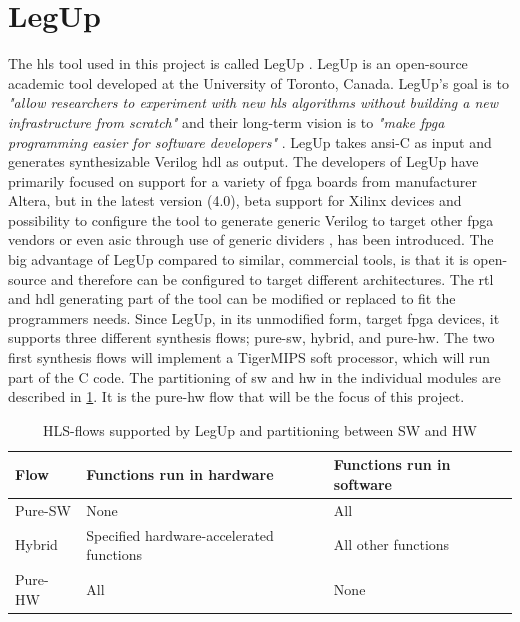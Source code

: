 \section{LegUp}
The \gls{hls} tool used in this project is called LegUp \cite{canis2011legup}. LegUp is an open-source academic tool developed at the University of Toronto, Canada. LegUp's goal is to \textit{"allow researchers to experiment with new \gls{hls} algorithms without building a new infrastructure from scratch"} and their long-term vision is to \textit{"make \gls{fpga} programming easier for software developers"} \cite{legupmain}. LegUp takes \gls{ansi}-C as input and generates synthesizable Verilog \gls{hdl} as output. The developers of LegUp have primarily focused on support for a variety of \gls{fpga} boards from manufacturer Altera, but in the latest version (4.0), beta support for Xilinx devices \cite{legupxilinx} and possibility to configure the tool to generate generic Verilog to target other \gls{fpga} vendors or even \gls{asic} through use of generic dividers \cite{legupfaq}, has been introduced. The big advantage of LegUp compared to similar, commercial tools, is that it is open-source and therefore can be configured to target different architectures. The \gls{rtl} and \gls{hdl} generating part of the tool can be modified or replaced to fit the programmers needs.
Since LegUp, in its unmodified form, target \gls{fpga} devices, it supports three different synthesis flows; pure-\gls{sw}, hybrid, and pure-\gls{hw}. The two first synthesis flows will implement a TigerMIPS \cite{tigmips} soft processor, which will run part of the C code. The partitioning of \gls{sw} and \gls{hw} in the individual modules are described in \cref{tab:legupflows}. It is the pure-\gls{hw} flow that will be the focus of this project.

\begin{table}[hbpt]
    \centering
    \caption{\label{tab:legupflows}HLS-flows supported by LegUp and partitioning between SW and HW}
    \begin{tabular}{lp{4.8cm}p{4.8cm}}
      \textbf{Flow} & \textbf{Functions run in hardware} & \textbf{Functions run in software}\\
      \toprule
      Pure-SW & None & All \\
      \hline
      Hybrid & Specified hardware-accelerated functions & All other functions \\
      \hline
      Pure-HW & All & None\\
      \bottomrule
    \end{tabular}
\end{table}

